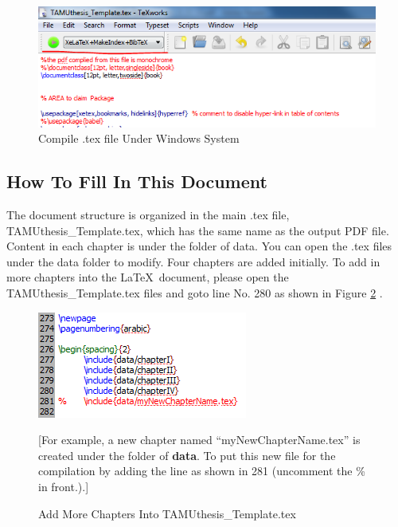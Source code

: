\begin{figure}[!htbp]
\begin{center}
\includegraphics[width=\textwidth, height=0.4\textheight,keepaspectratio]{graphic/TAMUthesis_GUI_windows.png}
\caption{Compile .tex file Under Windows System}
\label{fig:CompileLaTexGUI}
\end{center}
\end{figure}

\subsection{How To Fill In This Document}
The document structure is organized in the main .tex file, TAMUthesis\_Template.tex, which has the same name as the output PDF file. Content in each chapter is under the folder of data. You can open the .tex files under the data folder to modify. Four chapters are added initially. To add in more chapters into the \LaTeX ~document, please open the TAMUthesis\_Template.tex files and goto line No. 280 as shown in Figure \ref{fig:AddChapter} .

\begin{figure}[!htbp]
\begin{center}
\includegraphics[width=\textwidth, height=0.3\textheight,keepaspectratio]{graphic/TAMUthesis_AddChapter.png}
\caption{Add More Chapters Into TAMUthesis\_Template.tex}
[For example, a new chapter named ``myNewChapterName.tex'' is created under the folder of \textbf{data}. To put this new file for the compilation by adding the line \verb|| as shown in 281 (uncomment the \% in front.).]
\label{fig:AddChapter}
\end{center}
\end{figure}

